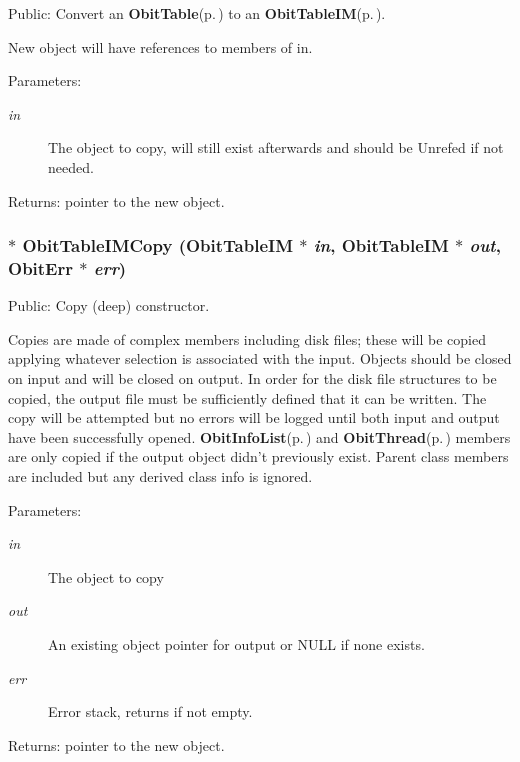 Public: Convert an {\bf Obit\-Table}{\rm (p.\,\pageref{structObitTable})} to an {\bf Obit\-Table\-IM}{\rm (p.\,\pageref{structObitTableIM})}. 

New object will have references to members of in. \begin{Desc}
\item[Parameters:]
\begin{description}
\item[{\em in}]The object to copy, will still exist afterwards and should be Unrefed if not needed. \end{description}
\end{Desc}
\begin{Desc}
\item[Returns:]pointer to the new object. \end{Desc}
\subsubsection{$\ast$ Obit\-Table\-IMCopy ({\bf Obit\-Table\-IM} $\ast$ {\em in}, {\bf Obit\-Table\-IM} $\ast$ {\em out}, {\bf Obit\-Err} $\ast$ {\em err})}\label{ObitTableIM_8h_a14}


Public: Copy (deep) constructor. 

Copies are made of complex members including disk files; these will be copied applying whatever selection is associated with the input. Objects should be closed on input and will be closed on output. In order for the disk file structures to be copied, the output file must be sufficiently defined that it can be written. The copy will be attempted but no errors will be logged until both input and output have been successfully opened. {\bf Obit\-Info\-List}{\rm (p.\,\pageref{structObitInfoList})} and {\bf Obit\-Thread}{\rm (p.\,\pageref{structObitThread})} members are only copied if the output object didn't previously exist. Parent class members are included but any derived class info is ignored. \begin{Desc}
\item[Parameters:]
\begin{description}
\item[{\em in}]The object to copy \item[{\em out}]An existing object pointer for output or NULL if none exists. \item[{\em err}]Error stack, returns if not empty. \end{description}
\end{Desc}
\begin{Desc}
\item[Returns:]pointer to the new object. \end{Desc}
